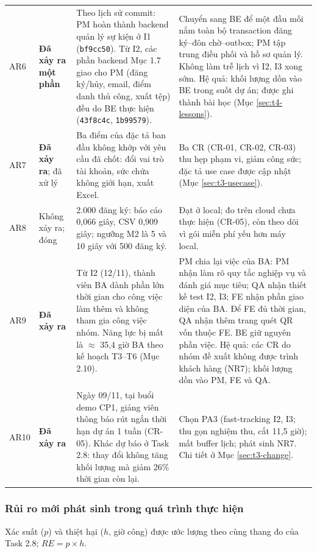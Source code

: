 \begin{longtable}{@{}p{.06\linewidth}p{.12\linewidth}p{.38\linewidth}p{.36\linewidth}@{}}
AR6 & \textbf{Đã xảy ra một phần} & Theo lịch sử commit: PM hoàn thành backend quản lý sự kiện ở I1 (\texttt{bf9cc50}). Từ I2, các phần backend Mục 1.7 giao cho PM (đăng ký/hủy, email, điểm danh thủ công, xuất tệp) đều do BE thực hiện (\texttt{43f8c4c}, \texttt{1b99579}). & Chuyển sang BE để một đầu mối nắm toàn bộ transaction đăng ký--đôn chờ--outbox; PM tập trung điều phối và hồ sơ quản lý. Không làm trễ lịch vì I2, I3 xong sớm. Hệ quả: khối lượng dồn vào BE trong suốt dự án; được ghi thành bài học (Mục \ref{sec:t4-lessons}).\\
AR7 & \textbf{Đã xảy ra}; đã xử lý & Ba điểm của đặc tả ban đầu không khớp với yêu cầu đã chốt: đổi vai trò tài khoản, sức chứa không giới hạn, xuất Excel. & Ba CR (CR-01, CR-02, CR-03) thu hẹp phạm vi, giảm công sức; đặc tả use case được cập nhật (Mục \ref{sec:t3-usecase}).\\
AR8 & Không xảy ra; đóng & 2.000 đăng ký: báo cáo 0,066 giây, CSV 0,909 giây; ngưỡng M2 là 5 và 10 giây với 500 đăng ký. & Đạt ở local; đo trên cloud chưa thực hiện (CR-05), còn theo dõi vì gói miễn phí yếu hơn máy local.\\
AR9 & \textbf{Đã xảy ra} & Từ I2 (12/11), thành viên BA dành phần lớn thời gian cho công việc làm thêm và không tham gia công việc nhóm. Năng lực bị mất là $\approx$ 35,4 giờ BA theo kế hoạch T3--T6 (Mục 2.10). & PM chia lại việc của BA: PM nhận làm rõ quy tắc nghiệp vụ và đánh giá mục tiêu; QA nhận thiết kế test I2, I3; FE nhận phần giao diện của BA. Để FE đủ thời gian, QA nhận thêm trang quét QR vốn thuộc FE. BE giữ nguyên phần việc. Hệ quả: các CR do nhóm đề xuất không được trình khách hàng (NR7); khối lượng dồn vào PM, FE và QA.\\
AR10 & \textbf{Đã xảy ra} & Ngày 09/11, tại buổi demo CP1, giảng viên thông báo rút ngắn thời hạn dự án 1 tuần (CR-05). Khác dự báo ở Task 2.8: thay đổi không tăng khối lượng mà giảm 26\% thời gian còn lại. & Chọn PA3 (fast-tracking I2, I3; thu gọn nghiệm thu, cắt 11,5 giờ); mất buffer lịch; phát sinh NR7. Chi tiết ở Mục \ref{sec:t3-change}.\\
\end{longtable}
\endgroup

\subsubsection{Rủi ro mới phát sinh trong quá trình thực hiện}

Xác suất ($p$) và thiệt hại ($h$, giờ công) được ước lượng theo cùng thang đo của Task 2.8; $RE = p \times h$.

